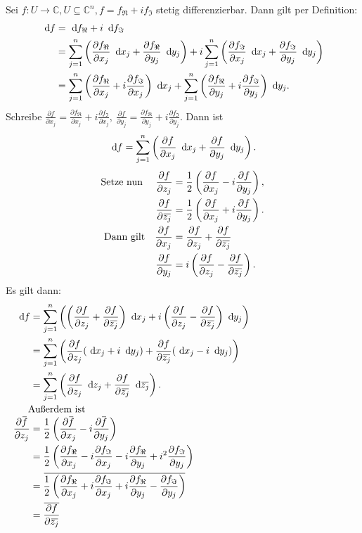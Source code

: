 \documentclass[a4paper,12pt]{article}
\theoremstyle{newthm}
\theoremstyle{newdef}
\theoremstyle{newrem}
\newcommand{\C}{\mathbb{C}}
\renewcommand{\d}{\ \operatorname{d}\hspace{-2px}}
\newcommand{\del}{\partial}
\newcommand{\overbar}[1]{\mkern 1.5mu\overline{\mkern-1.5mu#1\mkern-1.5mu}\mkern 1.5mu}
\begin{document}
		Sei $ f: U \to \C, U \subseteq \C^n, f= f_\Re + if_\Im $ stetig differenzierbar. Dann gilt per Definition:
		\begin{align*}
			\d f &= \d f_\Re + i\d f_\Im\\
			&= \sum_{j=1}^{n} \left( \frac{\del f_\Re}{\del x_j} \d x_j + \frac{\del f_\Re}{\del y_j}\d y_j \right) + i \sum_{j=1}^n \left( \frac{\del f_\Im}{\del x_j} \d x_j + \frac{\del f_\Im}{\del y_j} \d y_j \right)\\
			&= \sum_{j=1}^{n} \left( \frac{\del f_\Re}{\del x_j} + i \frac{\del f_\Im}{\del x_j} \right) \d x_j + \sum_{j=1}^n \left( \frac{\del f_\Re}{\del y_j} + i \frac{\del f_\Im}{\del y_j} \right) \d y_j.
		\end{align*}
		Schreibe $ \frac{\del f}{\del x_j} = \frac{\del f_\Re}{\del x_j} + i\frac{\del f_\Im}{\del x_j},\ \frac{\del f}{\del y_j} = \frac{\del f_\Re}{\del y_j} + i\frac{\del f_\Im}{\del y_j} $. Dann ist 
		\[ \d f = \sum_{j=1}^n \left( \frac{\del f}{\del x_j} \d x_j + \frac{\del f}{\del y_j} \d y_j \right). \]
		\begin{align*}
			\text{Setze nun }\quad \frac{\del f}{\del z_j} &= \frac{1}{2} \left( \frac{\del f}{\del x_j} - i \frac{\del f}{\del y_j} \right),\\
			\frac{\del f}{\del \overbar{z_j}} &= \frac{1}{2} \left( \frac{\del f}{\del x_j} + i \frac{\del f}{\del y_j} \right).\\
			\text{Dann gilt}\quad \frac{\del f}{\del x_j} &= \frac{\del f}{\del z_j} + \frac{\del f}{\del \overbar{z_j}}\\
			\frac{\del f}{\del y_j} &= i \left(\frac{\del f}{\del z_j} - \frac{\del f}{\del \overbar{z_j}}\right).
		\end{align*}
		Es gilt dann:
		\begin{align*}
			\d f &= \sum_{j=1}^{n} \left( \left( \frac{\del f}{\del z_j} + \frac{\del f}{\del \overbar{z_j}} \right) \d x_j + i \left( \frac{\del f}{\del z_j} - \frac{\del f}{\del \overbar{z_j}} \right) \d y_j \right)\\
			&= \sum_{j=1}^n \left( \frac{\del f}{\del z_j} (\d x_j + i\d y_j) + \frac{\del f}{\del \overbar{z_j}} (\d x_j - i\d y_j) \right)\\
			&= \sum_{j=1}^n \left( \frac{\del f}{\del z_j}\d z_j + \frac{\del f}{\del \overbar{z_j}}\d \overbar{z_j} \right).\\
		\noalign{Außerdem ist}
			\frac{\del \overbar{f}}{\del z_j} &= \frac{1}{2} \left( \frac{\del \overbar{f}}{\del x_j} - i\frac{\del \overbar{f}}{\del y_j} \right)\\
			&= \frac{1}{2} \left( \frac{\del f_\Re}{\del x_j} - i\frac{\del f_\Im}{\del x_j} - i\frac{\del f_\Re}{\del y_j} + i^2\frac{\del f_\Im}{\del y_j} \right)\\
			&= \overbar{\frac{1}{2} \left( \frac{\del f_\Re}{\del x_j} + i\frac{\del f_\Im}{\del x_j} + i\frac{\del f_\Re}{\del y_j} - \frac{\del f_\Im}{\del y_j} \right)}\\
			&= \overbar{\frac{\del f}{\del \overbar{z_j}}}
		\end{align*}
\end{document}
